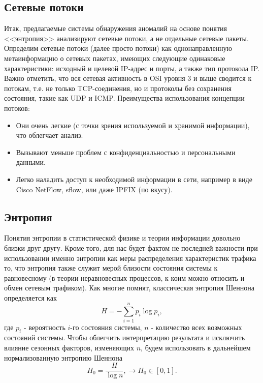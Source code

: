 \documentclass[]{interact}
\theoremstyle{plain}%
\theoremstyle{definition}
\theoremstyle{remark}
\begin{document}
\subsection{Сетевые потоки}\label{class}

Итак, предлагаемые системы обнаружения аномалий на основе понятия <<энтропия>> анализируют сетевые потоки, а не отдельные сетевые пакеты.
Определим сетевые потоки (далее просто потоки) как однонаправленную метаинформацию о сетевых пакетах, имеющих следующие одинаковые характеристики: исходный и целевой IP-адрес и порты, а также тип протокола IP. Важно отметить, что вся сетевая активность в OSI
уровня 3 и выше сводится к потокам, т.е. не только TCP-соединения, но и протоколы без сохранения состояния, такие как UDP и ICMP.
Преимущества использования концепции потоков:
\begin{itemize}
    \item Они очень легкие (с точки зрения используемой и хранимой информации), что облегчает анализ.
    \item Вызывают меньше проблем с конфиденциальностью и персональными данными.
    \item Легко наладить доступ к необходимой информации в сети, например в виде Cisco NetFlow, sflow, или даже IPFIX (по вкусу).
\end{itemize}


\subsection{Энтропия}
Понятия энтропии в статистической физике и теории информации довольно близки друг другу. Кроме того, для нас будет фактом не последней важности при использовании именно энтропии как меры распределения характеристик трафика то, что энтропия также служит мерой близости состояния системы к равновесному (в теории неравновесных процессов, к коим можно относить и обмен сетевым трафиком). Как многие помнят, классическая энтропия Шеннона определяется как
\begin{equation}
    H = - \sum^n_{i=1} p_i \log p_i,
\end{equation}
где $p_i$ - вероятность $i$-го состояния системы, $n$ - количество всех возможных состояний системы. Чтобы облегчить интерпретацию результата и исключить влияние сезонных факторов, изменяющих $n$, будем использовать в дальнейшем нормализованную энтропию Шеннона
\begin{equation}
    H_0 = \frac{H}{\log n}, \longrightarrow H_0 \in [0, 1].
\end{equation}
\end{document}
